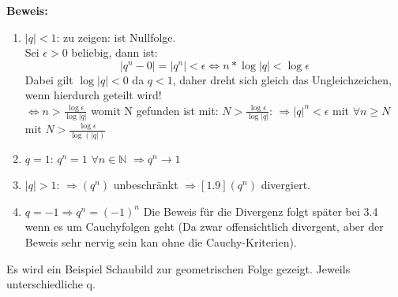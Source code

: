 \documentclass[12pt]{article}
\begin{document}
\textbf{Beweis:} \\

\begin{enumerate}[\bfseries 1)]
		\item $|q| < 1$: zu zeigen: ist Nullfolge.\\
		Sei $\epsilon > 0$ beliebig, dann ist: \\
		$$|q^n - 0| = |q^n| < \epsilon \Leftrightarrow n * \log |q| < \log\epsilon$$
		Dabei gilt $\log |q| < 0$ da $q< 1$, daher dreht sich gleich das Ungleichzeichen, wenn hierdurch geteilt wird!\\
		$\Leftrightarrow n > \frac{\log \epsilon}{\log|q|}$ womit N gefunden ist mit: $N >\frac{\log \epsilon}{\log|q|}$:
		$ \Rightarrow |q|^n < \epsilon$ mit $\forall n \geq N$ mit $N >\frac{\log \epsilon}{\log(|q|)}$\\
	
		\item $q=1$: $q^n = 1$ $\forall n \in \mathbb{N}$ $\Rightarrow q^n \rightarrow 1$\\
		\item $|q| > 1$: $\Rightarrow (q^n)$ unbeschränkt $\Rightarrow[\text{1.9}] (q^n) $ divergiert.\\
		\item $q = -1 \Rightarrow q^n = (-1)^n$ Die Beweis für die Divergenz folgt später bei 3.4 wenn es um Cauchyfolgen geht (Da zwar offensichtlich divergent, aber der Beweis sehr nervig sein kan ohne die Cauchy-Kriterien).
\end{enumerate}

Es wird ein Beispiel Schaubild zur geometrischen Folge gezeigt. Jeweils unterschiedliche q. 


\\
\end{document}
